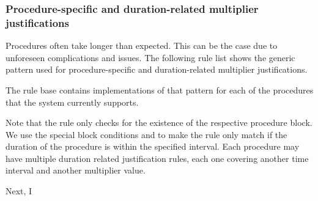 \subsubsection{Procedure-specific and duration-related multiplier justifications}
Procedures often take longer than expected.
This can be the case due to unforeseen complications and issues.
The following rule list shows the generic pattern used for procedure-specific and duration-related multiplier justifications.



The rule base contains implementations of that pattern for each of the procedures that the system currently supports.

Note that the rule only checks for the existence of the respective procedure block.
We use the special block conditions  and  to make the rule only match if the duration of the procedure is within the specified interval.
Each procedure may have multiple duration related justification rules, each one covering another time interval and another multiplier value.






Next, I
